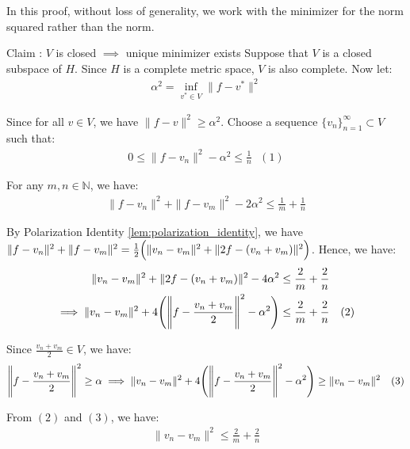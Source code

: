 \begin{proof*}
    In this proof, without loss of generality, we work with the minimizer for the norm squared rather than the norm.

    \begin{subproof}{Claim : $V$ is closed $\implies$ unique minimizer exists}
        Suppose that $V$ is a closed subspace of $H$. Since $H$ is a complete metric space, $V$ is also complete. Now let:
        \begin{align*}
            \alpha^2 = \inf_{v^* \in V } \| f - v^*\|^2
        \end{align*}

        \noindent Since for all $v\in V$, we have $\|f - v\|^2 \ge \alpha^2$. Choose a sequence $\{v_n\}_{n=1}^\infty \subset V$ such that:
        \begin{align*}
            0 \le \|f - v_n \|^2 - \alpha^2 \le \frac{1}{n} \ \ \ (1)
        \end{align*}

        \noindent For any $m, n \in \mathbb{N}$, we have:
        \begin{align*}
            \|f - v_n\|^2 + \|f - v_m\|^2 - 2\alpha^2 \le \frac{1}{m} + \frac{1}{n}
        \end{align*}

        \noindent By Polarization Identity \ref{lem:polarization_identity}, we have $\|f-v_n\|^2 + \|f-v_m\|^2 = \frac{1}{2}\Big( \|v_n-v_m\|^2 + \|2f - (v_n+v_m)\|^2 \Big)$. Hence, we have:
        \begin{align*}
            \|v_n-v_m\|^2 + \|2f - (v_n+v_m)\|^2 - 4\alpha^2 &\le \frac{2}{m} + \frac{2}{n} \\
            \implies \|v_n-v_m\|^2 + 4\Bigg( 
                \Bigg\| f - \frac{v_n + v_m}{2} \Bigg\|^2 - \alpha^2
             \Bigg) &\le \frac{2}{m} + \frac{2}{n} \ \ \ (2)
        \end{align*}

        \noindent Since $\frac{v_n + v_m}{2}\in V$, we have:
        \begin{align*}
            \Bigg\| f - \frac{v_n + v_m}{2} \Bigg\|^2 \ge \alpha \implies \|v_n-v_m\|^2 + 4\Bigg( 
                \Bigg\| f - \frac{v_n + v_m}{2} \Bigg\|^2 - \alpha^2
             \Bigg) \ge \|v_n-v_m\|^2 \ \ \ (3)
        \end{align*}

        \noindent From $(2)$ and $(3)$, we have:
        \begin{align*}
            \|v_n-v_m\|^2 \le \frac{2}{m} + \frac{2}{n} 
        \end{align*}


\end{subproof}
\end{proof*}
